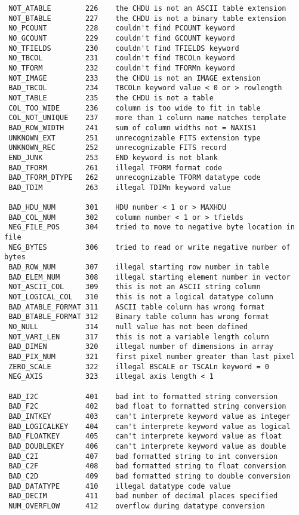 \begin{verbatim}
 NOT_ATABLE        226    the CHDU is not an ASCII table extension
 NOT_BTABLE        227    the CHDU is not a binary table extension
 NO_PCOUNT         228    couldn't find PCOUNT keyword
 NO_GCOUNT         229    couldn't find GCOUNT keyword
 NO_TFIELDS        230    couldn't find TFIELDS keyword
 NO_TBCOL          231    couldn't find TBCOLn keyword
 NO_TFORM          232    couldn't find TFORMn keyword
 NOT_IMAGE         233    the CHDU is not an IMAGE extension
 BAD_TBCOL         234    TBCOLn keyword value < 0 or > rowlength
 NOT_TABLE         235    the CHDU is not a table
 COL_TOO_WIDE      236    column is too wide to fit in table
 COL_NOT_UNIQUE    237    more than 1 column name matches template
 BAD_ROW_WIDTH     241    sum of column widths not = NAXIS1
 UNKNOWN_EXT       251    unrecognizable FITS extension type
 UNKNOWN_REC       252    unrecognizable FITS record
 END_JUNK          253    END keyword is not blank
 BAD_TFORM         261    illegal TFORM format code
 BAD_TFORM_DTYPE   262    unrecognizable TFORM datatype code
 BAD_TDIM          263    illegal TDIMn keyword value

 BAD_HDU_NUM       301    HDU number < 1 or > MAXHDU
 BAD_COL_NUM       302    column number < 1 or > tfields
 NEG_FILE_POS      304    tried to move to negative byte location in file
 NEG_BYTES         306    tried to read or write negative number of bytes
 BAD_ROW_NUM       307    illegal starting row number in table
 BAD_ELEM_NUM      308    illegal starting element number in vector
 NOT_ASCII_COL     309    this is not an ASCII string column
 NOT_LOGICAL_COL   310    this is not a logical datatype column
 BAD_ATABLE_FORMAT 311    ASCII table column has wrong format
 BAD_BTABLE_FORMAT 312    Binary table column has wrong format
 NO_NULL           314    null value has not been defined
 NOT_VARI_LEN      317    this is not a variable length column
 BAD_DIMEN         320    illegal number of dimensions in array
 BAD_PIX_NUM       321    first pixel number greater than last pixel
 ZERO_SCALE        322    illegal BSCALE or TSCALn keyword = 0
 NEG_AXIS          323    illegal axis length < 1

 BAD_I2C           401    bad int to formatted string conversion
 BAD_F2C           402    bad float to formatted string conversion
 BAD_INTKEY        403    can't interprete keyword value as integer
 BAD_LOGICALKEY    404    can't interprete keyword value as logical
 BAD_FLOATKEY      405    can't interprete keyword value as float
 BAD_DOUBLEKEY     406    can't interprete keyword value as double
 BAD_C2I           407    bad formatted string to int conversion
 BAD_C2F           408    bad formatted string to float conversion
 BAD_C2D           409    bad formatted string to double conversion
 BAD_DATATYPE      410    illegal datatype code value
 BAD_DECIM         411    bad number of decimal places specified
 NUM_OVERFLOW      412    overflow during datatype conversion
\end{verbatim}


